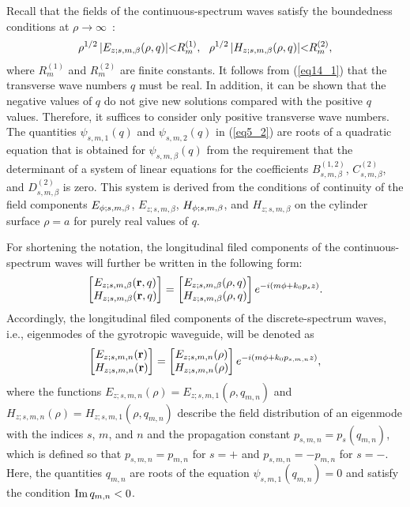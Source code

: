 \documentclass[conference,a4paper]{IEEEtran}
\begin{document}
Recall that the fields of the continuous-spectrum waves satisfy the boundedness conditions at $\rho\to\infty$~\cite{Shevchenko1971,Eskin2017}:
\begin{eqnarray}\label{eq14_1}
\rho^{1/2}\,|{E}_{z;s,m,\beta}(\rho, q)|{<}R^{(1)}_m,\,\,\,\,\rho^{1/2}\,|{H}_{z;s,m,\beta}(\rho, q)|{<}R^{(2)}_m,
\end{eqnarray}
where $R^{(1)}_m$ and $R^{(2)}_m$ are finite constants.
It follows from (\ref{eq14_1}) that the transverse wave numbers $q$ must be real. In addition, it can be shown that the negative values of $q$ do not give new solutions compared with the positive
$q$ values. Therefore, it suffices to consider only positive transverse wave numbers.
The quantities $\psi_{s,m, 1}(q)$ and $\psi_{s,m, 2}(q)$ in (\ref{eq5_2}) are roots of a quadratic equation that is obtained for $\psi_{s,m, \beta}(q)$ from the requirement that the determinant of a system of linear equations for the coefficients $B_{s,m,\beta}^{(1,2)}$, $C_{s,m,\beta}^{(2)}$, and $D_{s,m,\beta}^{(2)}$ is zero. This system is derived from the conditions of continuity of the field components $E_{\phi;s,m,\beta}$, $E_{z;s,m,\beta}$, $H_{\phi;s,m,\beta}$, and $H_{z;s,m,\beta}$ on the cylinder surface $\rho=a$ for  purely real values of $q$.

For shortening the notation, the longitudinal filed components of the continuous-spectrum waves will further be written in the following form:
\begin{equation}\label{eq19}
\begin{bmatrix} {E}_{z;s,m,\beta} ({\bf r},q)\\
{H}_{z;s,m,\beta} ({\bf r},q)\end{bmatrix} =\begin{bmatrix} {E}_{z;s,m,\beta}(\rho,q)\\ {H}_{z;s,m,\beta}(\rho,q)\end{bmatrix}e^{-i (m\phi + k_0 p_{{s}}z)}.
\end{equation}
Accordingly, the longitudinal filed components of the discrete-spectrum waves, i.e., eigenmodes of the gyrotropic waveguide, will be denoted as
\begin{equation}\label{eq13}
\begin{bmatrix} {E}_{z;s,m,n} ({\bf r})\\
{H}_{z;s,m,n} ({\bf r})\end{bmatrix} =\begin{bmatrix} {E}_{z;s,m,n}(\rho)\\ {H}_{z;s,m,n}(\rho)\end{bmatrix}e^{-i (m\phi + k_0 p_{{s},m,n}z)},
\end{equation}
where the functions ${E}_{z;s,m,n}(\rho)={E}_{z;s,m,1}(\rho,q_{m,n})$ and ${H}_{z;s,m,n}(\rho)={H}_{z;s,m,1}(\rho,q_{m,n})$ describe the field distribution of an eigenmode with the indices $s$, $m$, and $n$ and the
propagation constant $p_{s,m,n}=p_s(q_{m,n})$, which is defined so that $p_{s,m,n}=p_{m,n}$  for $s=+$ and $p_{s,m,n}=-p_{m,n}$ for $s=-$. Here, the quantities $q_{m,n}$ are roots of the equation $\psi_{s,m,1}(q_{m,n})=0$ and satisfy the condition ${\rm Im}\,q_{m,n} < 0$. %
\end{document}
